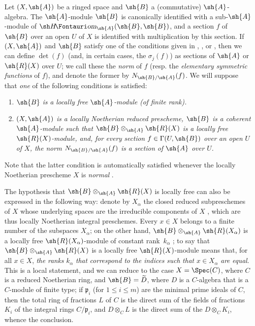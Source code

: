 \begin{env}[6.5.1]
\label{II.6.5.1}
Let $(X,\sh{A})$ be a ringed space and $\sh{B}$ a (commutative) $\sh{A}$-algebra.
The $\sh{A}$-module $\sh{B}$ is canonically identified with a sub-$\sh{A}$-module of $\shHom_{\sh{A}}(\sh{B},\sh{B})$, and a section $f$ of $\sh{B}$ over an open $U$ of $X$ is identified with multiplication by this section.
If $(X,\sh{A})$ and $\sh{B}$ satisfy one of the conditions given in , , or , then we can define $\det(f)$ (and, in certain cases, the $\sigma_j(f)$) as sections of $\sh{A}$ or $\sh{R}(X)$ over $U$; we call these the \emph{norm} of $f$ (resp. the \emph{elementary symmetric functions} of $f$), and denote the former by $N_{\sh{B}/\sh{A}}(f)$.
We will suppose that \emph{one} of the following conditions is satisfied:
\begin{enumerate}
  \item[(I)] \emph{$\sh{B}$ is a locally free $\sh{A}$-module (of finite rank).}
  \item[(II)] \emph{$(X,\sh{A})$ is a locally Noetherian reduced prescheme, $\sh{B}$ is a coherent $\sh{A}$-module such that $\sh{B}\otimes_{\sh{A}}\sh{R}(X)$ is a locally free $\sh{R}(X)$-module, and, for every section $f\in\Gamma(U,\sh{B})$ over an open $U$ of $X$, the norm $N_{\sh{B}/\sh{A}}(f)$ is a section of $\sh{A}$ over $U$.}
\end{enumerate}

Note that the latter condition is automatically satisfied whenever the locally Noetherian prescheme $X$ is \emph{normal} .

The hypothesis that $\sh{B}\otimes_{\sh{A}}\sh{R}(X)$ is locally free can also be expressed in the following way: denote by $X_\alpha$ the closed reduced subpreschemes of $X$ whose underlying spaces are the irreducible components of $X$ , which are thus locally Noetherian integral preschemes.
Every $x\in X$ belongs to a finite number of the subspaces $X_\alpha$;
on the other hand, $\sh{B}\otimes_{\sh{A}}\sh{R}(X_\alpha)$ is a locally free $\sh{R}(X_\alpha)$-module of constant rank~$k_\alpha$ ;
to say that $\sh{B}\otimes_{\sh{A}}\sh{R}(X)$ is a locally free $\sh{R}(X)$-module means that, for all $x\in X$, \emph{the ranks $k_\alpha$ that correspond to the indices such that $x\in X_\alpha$ are equal}.
This is a local statement, and we can reduce to the case $X=\Spec(C)$, where $C$ is a reduced Noetherian ring, and $\sh{B}=\widetilde{D}$, where $D$ is a $C$-algebra that is a $C$-module of finite type;
if $\mathfrak{p}_i$ (for $1\leq i\leq m$) are the minimal prime ideals of $C$, then the total ring of fractions $L$ of $C$ is the direct sum of the fields of fractions $K_i$ of the integral rings $C/\mathfrak{p}_i$, and $D\otimes_C L$ is the direct sum of the $D\otimes_C K_i$, whence the conclusion.


\end{env}
